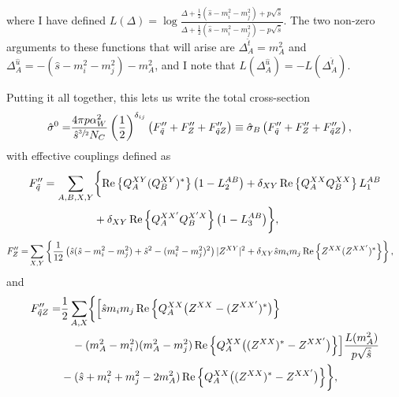 \documentclass[../main.tex]{subfiles}
\begin{document}
where I have defined \(L(\Delta) = \log\frac{\Delta + \frac{1}{2}(\hat{s}-m_i^2-m_j^2) + p\sqrt{\hat{s}}}{\Delta + \frac{1}{2}(\hat{s}-m_i^2-m_j^2) - p\sqrt{\hat{s}}}\).
The two non-zero arguments to these functions that will arise are \(\Delta^{\hat{t}}_A = m_A^2\) and \(\Delta^{\hat{u}}_A = -(\hat{s}-m_i^2-m_j^2) - m_A^2\), and I note that \(L(\Delta^{\hat{u}}_A) = -L(\Delta^{\hat{t}}_A)\).

Putting it all together, this lets us write the total cross-section
\begin{align}
  \label{pc:eq:born}
  \hat\sigma^0 = & \frac{4 \pi p \alpha_W^2}{\hat{s}^{\sfrac{3}{2}} N_C} \pclosed{\frac{1}{2}}^{\delta_{ij}} \pclosed{F^{\prime\prime}_{\tilde{q}} + F^{\prime\prime}_Z + F^{\prime\prime}_{\tilde{q}Z}} \equiv \hat{\sigma}_B \pclosed{F^{\prime\prime}_{\tilde{q}} + F^{\prime\prime}_Z + F^{\prime\prime}_{\tilde{q}Z}},
\end{align}
with effective couplings defined as
\\
\begin{align}
  \label{pc:eq:eff_coupling_Fq}
  \nonumber
  F^{\prime\prime}_{\tilde{q}} = \sum_{A,B,X,Y} & \biggl\{\Re{Q_A^{XY} (Q_B^{XY})^\ast} \pclosed{1 - L_2^{AB}} + \delta_{XY}\Re{Q_A^{XX} Q_B^{XX}} L_1^{AB} \\
                                                & + \delta_{XY} \Re{Q_A^{XX^\prime} Q_B^{X^\prime X}} \pclosed{1 - L_3^{AB}} \biggr\},
\end{align}
\begin{align}
  \label{pc:eq:eff_coupling_FZ}
  F^{\prime\prime}_{Z} = & \sum_{X,Y} \cclosed{\frac{1}{12} \pclosed{\hat{s}(\hat{s}-m_i^2-m_j^2) + \hat{s}^2 - (m_i^2-m_j^2)^2} |Z^{XY}|^2 + \delta_{XY} \hat{s}m_i m_j \Re{Z^{XX} (Z^{XX^\prime})^\ast}},
\end{align}
and
\begin{align}
  \label{pc:eq:eff_coupling_FqZ}
  \nonumber
  F^{\prime\prime}_{\tilde{q}Z} = & \frac{1}{2} \sum_{A, X} \biggl\{
  \Bigl[\hat{s} m_i m_j \Re{Q_A^{XX} \bigl(Z^{XX} - (Z^{XX^\prime})^\ast\bigr)}                                                                                       \\
  \nonumber
                                  & \quad - (m_A^2-m_i^2)(m_A^2-m_j^2) \Re{Q_A^{XX}\bigl((Z^{XX})^\ast - Z^{XX^\prime}\bigr)}\Bigr] \frac{L(m_A^2)}{p \sqrt{\hat{s}}} \\
                                  & - (\hat{s} + m_i^2 + m_j^2 - 2m_A^2) \Re{Q_A^{XX}\bigl((Z^{XX})^\ast - Z^{XX^\prime}\bigr)}
  \biggr\},
\end{align}
\end{document}
